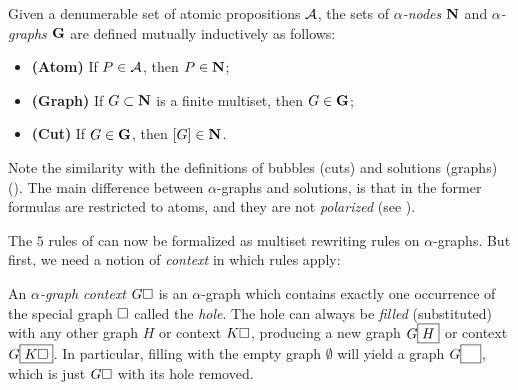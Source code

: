 \begin{definition} 
  
  Given a denumerable set of atomic propositions $\mathcal{A}$, the sets of
  \emph{$\alpha$-nodes} $\mathbf{N}$ and \emph{$\alpha$-graphs} $\mathbf{G}$ are
  defined mutually inductively as follows:
  \begin{itemize}
    \item \textbf{(Atom)} If $P \in \mathcal{A}$, then $P \in \mathbf{N}$;
    \item \textbf{(Graph)} If $G \subset \mathbf{N}$ is a finite multiset, then $G
    \in \mathbf{G}$;
    \item \textbf{(Cut)} If $G \in \mathbf{G}$, then $[G] \in \mathbf{N}$.
  \end{itemize}
\end{definition}

Note the similarity with the definitions of bubbles (cuts) and solutions
(graphs) (). The main difference between $\alpha$-graphs and
solutions, is that in the former formulas are restricted to atoms, and they are
not \emph{polarized} (see ).

The $5$ rules of  can now be formalized as multiset rewriting rules
on $\alpha$-graphs. But first, we need a notion of \emph{context} in which rules
apply:

\begin{definition}
  An \emph{$\alpha$-graph context} $G\square$ is an $\alpha$-graph which contains
  exactly one occurrence of the special graph $\square$ called the \emph{hole}.
  The hole can always be \emph{filled} (substituted) with any other graph $H$ or
  context $K\square$, producing a new graph $G\fbox{$H$}$ or context
  $G\fbox{$K\square$}$. In particular, filling with the empty graph $\emptyset$
  will yield a graph $G\fbox{$\phantom{G}$}$, which is just $G\square$ with its
  hole removed.
\end{definition}

